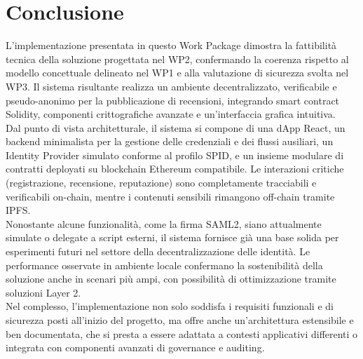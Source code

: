     \section{Conclusione}
        L'implementazione presentata in questo Work Package dimostra la fattibilità tecnica della soluzione progettata nel WP2, confermando la coerenza rispetto al modello concettuale delineato nel WP1 e alla valutazione di sicurezza svolta nel WP3. Il sistema risultante realizza un ambiente decentralizzato, verificabile e pseudo-anonimo per la pubblicazione di recensioni, integrando smart contract Solidity, componenti crittografiche avanzate e un'interfaccia grafica intuitiva. \\
        Dal punto di vista architetturale, il sistema si compone di una dApp React, un backend minimalista per la gestione delle credenziali e dei flussi ausiliari, un Identity Provider simulato conforme al profilo SPID, e un insieme modulare di contratti deployati su blockchain Ethereum compatibile. Le interazioni critiche (registrazione, recensione, reputazione) sono completamente tracciabili e verificabili on-chain, mentre i contenuti sensibili rimangono off-chain tramite IPFS. \\
        Nonostante alcune funzionalità, come la firma SAML2, siano attualmente simulate o delegate a script esterni, il sistema fornisce già una base solida per esperimenti futuri nel settore della decentralizzazione delle identità. Le performance osservate in ambiente locale confermano la sostenibilità della soluzione anche in scenari più ampi, con possibilità di ottimizzazione tramite soluzioni Layer 2. \\
        Nel complesso, l'implementazione non solo soddisfa i requisiti funzionali e di sicurezza posti all'inizio del progetto, ma offre anche un'architettura estensibile e ben documentata, che si presta a essere adattata a contesti applicativi differenti o integrata con componenti avanzati di governance e auditing.
        